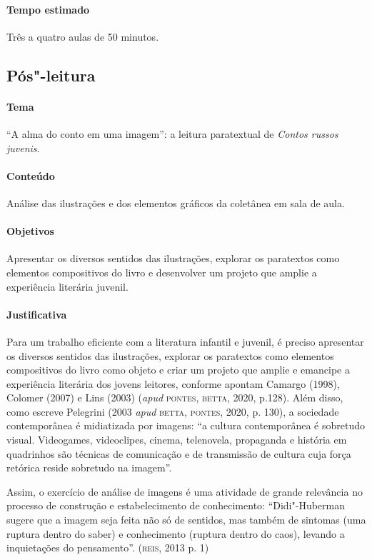 \documentclass[11pt]{extarticle}
\begin{document}
\paragraph{Tempo estimado} Três a quatro aulas de 50 minutos.

\subsection{Pós"-leitura}


\paragraph{Tema} ``A alma do conto em uma imagem'': a leitura paratextual de \emph{Contos russos juvenis}.


\paragraph{Conteúdo}
Análise das ilustrações e dos elementos gráficos da coletânea em sala de aula.

\paragraph{Objetivos}
Apresentar os diversos sentidos das ilustrações, explorar os paratextos
como elementos compositivos do livro e desenvolver um projeto que amplie
a experiência literária juvenil.

\paragraph{Justificativa}
Para um trabalho eficiente com a literatura infantil e juvenil, é
preciso apresentar os diversos sentidos das ilustrações, explorar os
paratextos como elementos compositivos do livro como objeto e criar um
projeto que amplie e emancipe a experiência literária dos jovens
leitores, conforme apontam Camargo (1998), Colomer (2007) e Lins (2003)
(\emph{apud} \textsc{pontes}, \textsc{betta}, 2020, p.128). Além disso, como escreve
Pelegrini (2003 \emph{apud} \textsc{betta}, \textsc{pontes}, 2020, p. 130), a sociedade
contemporânea é midiatizada por imagens: ``a cultura contemporânea é
sobretudo visual. Videogames, videoclipes, cinema, telenovela,
propaganda e história em quadrinhos são técnicas de comunicação e de
transmissão de cultura cuja força retórica reside sobretudo na imagem''.

Assim, o exercício de análise de imagens é uma atividade de grande
relevância no processo de construção e estabelecimento de conhecimento:
``Didi"-Huberman sugere que a imagem seja feita não só de sentidos, mas
também de sintomas (uma ruptura dentro do saber) e conhecimento (ruptura
dentro do caos), levando a inquietações do pensamento''. (\textsc{reis}, 2013 p. 1)
\end{document}
